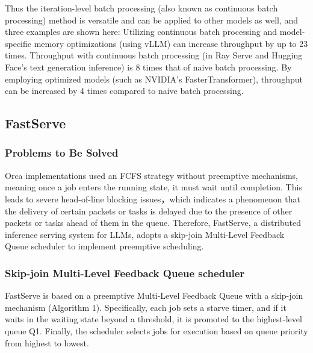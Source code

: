 \documentclass[conference]{IEEEtran}
\begin{document}
Thus the iteration-level batch processing (also known as continuous batch processing) method is versatile and can be applied to other models as well, and three examples are shown here:
Utilizing continuous batch processing and model-specific memory optimizations (using vLLM) can increase throughput by up to 23 times.  \cite{b11}
Throughput with continuous batch processing (in Ray Serve and Hugging Face's text generation inference) is 8 times that of naive batch processing. \cite{b12}
By employing optimized models (such as NVIDIA's FasterTransformer), throughput can be increased by 4 times compared to naive batch processing. \cite{b12}

\subsection{FastServe}
\subsubsection{Problems to Be Solved}

Orca implementations used an FCFS strategy without preemptive mechanisms, meaning once a job enters the running state, it must wait until completion. This leads to severe head-of-line blocking issues，which indicates a phenomenon that the delivery of certain packets or tasks is delayed due to the presence of other packets or tasks ahead of them in the queue. Therefore, FastServe, a distributed inference serving system for LLMs, adopts a skip-join Multi-Level Feedback Queue scheduler to implement preemptive scheduling.
\subsubsection{Skip-join Multi-Level Feedback Queue scheduler}


FastServe is based on a preemptive Multi-Level Feedback Queue with a skip-join mechanism (Algorithm 1). Specifically, each job sets a starve timer, and if it waits in the waiting state beyond a threshold, it is promoted to the highest-level queue Q1. Finally, the scheduler selects jobs for execution based on queue priority from highest to lowest.
\end{document}
